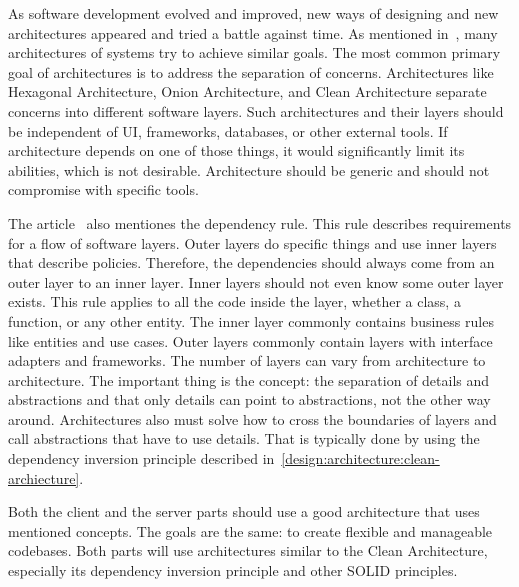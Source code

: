 As software development evolved and improved, new ways of designing and new architectures appeared and tried a battle against time.
As mentioned in~\cite{a2021_clean_architecture_blog}, many architectures of systems try to achieve similar goals.
The most common primary goal of architectures is to address the separation of concerns.
Architectures like Hexagonal Architecture, Onion Architecture, and Clean Architecture separate concerns into different software layers.
Such architectures and their layers should be independent of UI, frameworks, databases, or other external tools.
If architecture depends on one of those things, it would significantly limit its abilities, which is not desirable.
Architecture should be generic and should not compromise with specific tools.

The article~\cite{a2021_clean_architecture_blog} also mentiones the dependency rule.
This rule describes requirements for a flow of software layers.
Outer layers do specific things and use inner layers that describe policies.
Therefore, the dependencies should always come from an outer layer to an inner layer.
Inner layers should not even know some outer layer exists.
This rule applies to all the code inside the layer, whether a class, a function, or any other entity.
The inner layer commonly contains business rules like entities and use cases.
Outer layers commonly contain layers with interface adapters and frameworks.
The number of layers can vary from architecture to architecture.
The important thing is the concept: the separation of details and abstractions and that only details can point to abstractions, not the other way around.
Architectures also must solve how to cross the boundaries of layers and call abstractions that have to use details.
That is typically done by using the dependency inversion principle described in~\ref{design:architecture:clean-archiecture}.

Both the client and the server parts should use a good architecture that uses mentioned concepts.
The goals are the same: to create flexible and manageable codebases.
Both parts will use architectures similar to the Clean Architecture, especially its dependency inversion principle and other SOLID principles.

